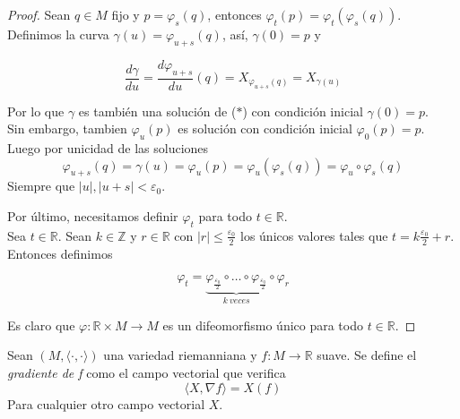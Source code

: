 \begin{proof}
    Sean $q\in M$ fijo y  $p=\varphi_s(q)$, entonces $\varphi_t(p)=\varphi_t(\varphi_s(q))$. Definimos la curva $\gamma(u)=\varphi_{u+s}(q)$, así, $\gamma(0)=p$ y 
    
    \begin{equation*}
        \frac{d\gamma}{du}=\frac{d\varphi_{u+s}}{du}(q)=X_{\varphi_{u+s}(q)}=X_{\gamma (u)}
    \end{equation*} 
    
    Por lo que $\gamma$ es también una solución de ($\ast$) con condición inicial $\gamma(0)=p$.\\

    Sin embargo, tambien $\varphi_u(p)$ es solución con condición inicial $\varphi_0(p)=p$. Luego por unicidad de las soluciones
    \begin{equation*}
        \varphi_{u+s}(q)=\gamma(u)=\varphi_u(p)=\varphi_u(\varphi_s(q))=\varphi_u\circ \varphi_s(q)
    \end{equation*}
    Siempre que $|u|, |u+s|<\varepsilon_0$.

    Por último, necesitamos definir $\varphi_t$ para todo $t\in \mathbb{R}$.\\

    Sea $t\in \mathbb{R}$. Sean $k\in \mathbb{Z}$ y $r\in \mathbb{R}$ con $|r|\le \frac{\varepsilon_0}{2}$ los únicos valores tales que $t=k\frac{\varepsilon_0}{2}+r$. Entonces definimos

    \begin{equation*}
        \varphi_t=\underbrace{\varphi_{\frac{\varepsilon_0}{2}}\circ \dots \circ \varphi_{\frac{\varepsilon_0}{2}}}_{k~veces}\circ \varphi_r 
    \end{equation*}

    Es claro que $\varphi:\mathbb{R}\times M\to M$ es un difeomorfismo único para todo $t\in \mathbb{R}$.

\end{proof}

\begin{definition}
    Sean $(M,\langle\cdot,\cdot\rangle)$ una variedad riemanniana y $f:M\to\mathbb{R}$ suave. Se define el \textit{gradiente de f} como el campo vectorial que verifica 
    \begin{equation*}
        \langle X,\nabla f\rangle = X(f)
    \end{equation*}
    Para cualquier otro campo vectorial $X$.
\end{definition}
\bigskip

